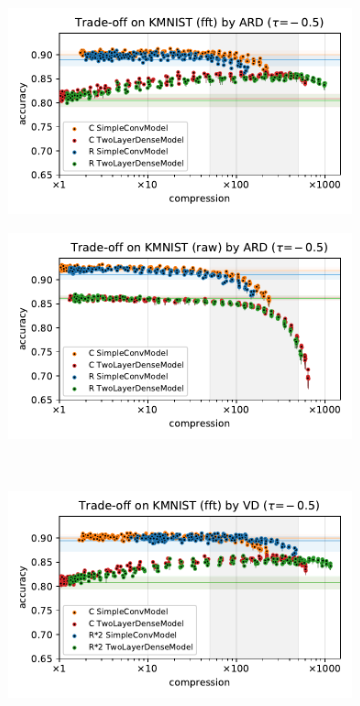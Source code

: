 \documentclass[a4paper,10pt,onecolumn]{article}
\begin{document}
\begin{figure}[b]
\begin{subfigure}[b]{0.5\columnwidth}
  \end{subfigure} \\ %
  \begin{subfigure}[b]{0.5\columnwidth}
    \centering
    \includegraphics[width=\columnwidth]{figure__mnist-like__trade-off/appendix__ARD__kmnist__fft__-0.5.pdf}
  \end{subfigure}%
  \begin{subfigure}[b]{0.5\columnwidth}
    \centering
    \includegraphics[width=\columnwidth]{figure__mnist-like__trade-off/appendix__ARD__kmnist__raw__-0.5.pdf}
  \end{subfigure} \\ %
  \begin{subfigure}[b]{0.5\columnwidth}
    \centering
    \includegraphics[width=\columnwidth]{figure__mnist-like__trade-off/appendix__cmp__VD__kmnist__fft__-0.5.pdf}

\end{subfigure}
\end{figure}
\end{document}
